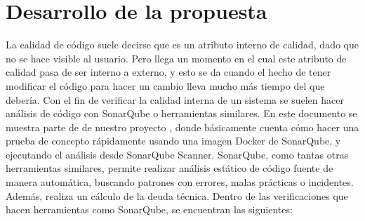 \documentclass[preprint,12pt,notitlepage]{elsarticle}
\begin{document}
\section{Desarrollo de la propuesta}
La calidad de código suele decirse que es un atributo interno de calidad, dado que no se hace visible al usuario. Pero llega un momento en el cual este atributo de calidad pasa de ser interno a externo, y esto se da cuando el hecho de tener modificar el código para hacer un cambio lleva mucho más tiempo del que debería. Con el fin de verificar la calidad interna de un sistema se suelen hacer análisis de código con SonarQube o herramientas similares. En este documento se muestra parte de de nuestro proyecto , donde básicamente cuenta cómo hacer una prueba de concepto rápidamente usando una imagen Docker de SonarQube, y ejecutando el análisis desde SonarQube Scanner.
SonarQube, como tantas otras herramientas similares, permite realizar análisis estático de código fuente de manera automática, buscando patrones con errores, malas prácticas o incidentes. Además, realiza un cálculo de la deuda técnica. Dentro de las verificaciones que hacen herramientas como SonarQube, se encuentran las siguientes:
\end{document}
